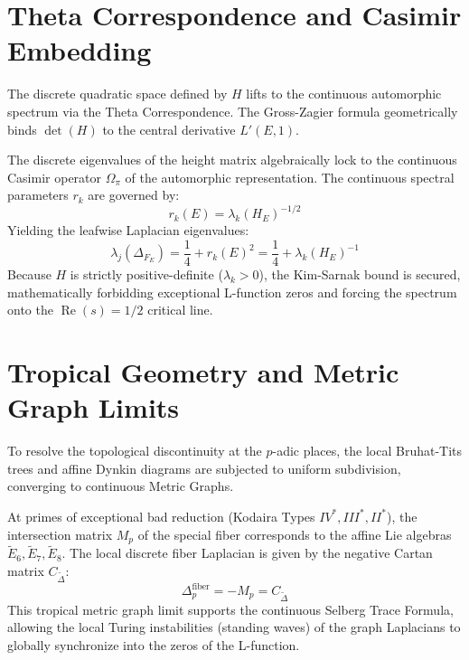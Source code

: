\documentclass[11pt]{article}
\begin{document}
\section{Theta Correspondence and Casimir Embedding}
The discrete quadratic space defined by $H$ lifts to the continuous automorphic spectrum via the Theta Correspondence. The Gross-Zagier formula geometrically binds $\det(H)$ to the central derivative $L'(E,1)$. 

The discrete eigenvalues of the height matrix algebraically lock to the continuous Casimir operator $\Omega_{\pi}$ of the automorphic representation. The continuous spectral parameters $r_k$ are governed by:
\begin{equation}
r_k(E) = \lambda_k(H_E)^{-1/2}
\end{equation}
Yielding the leafwise Laplacian eigenvalues:
\begin{equation}
\lambda_j(\Delta_{F_E}) = \frac{1}{4} + r_k(E)^2 = \frac{1}{4} + \lambda_k(H_E)^{-1}
\end{equation}
Because $H$ is strictly positive-definite ($\lambda_k > 0$), the Kim-Sarnak bound is secured, mathematically forbidding exceptional L-function zeros and forcing the spectrum onto the $\operatorname{Re}(s) = 1/2$ critical line.

\section{Tropical Geometry and Metric Graph Limits}
To resolve the topological discontinuity at the $p$-adic places, the local Bruhat-Tits trees and affine Dynkin diagrams are subjected to uniform subdivision, converging to continuous Metric Graphs. 

At primes of exceptional bad reduction (Kodaira Types $IV^*, III^*, II^*$), the intersection matrix $M_p$ of the special fiber corresponds to the affine Lie algebras $\tilde{E}_6, \tilde{E}_7, \tilde{E}_8$. The local discrete fiber Laplacian is given by the negative Cartan matrix $C_{\tilde{\Delta}}$:
\begin{equation}
\Delta_p^{\mathrm{fiber}} = -M_p = C_{\tilde{\Delta}}
\end{equation}
This tropical metric graph limit supports the continuous Selberg Trace Formula, allowing the local Turing instabilities (standing waves) of the graph Laplacians to globally synchronize into the zeros of the L-function.
\end{document}
